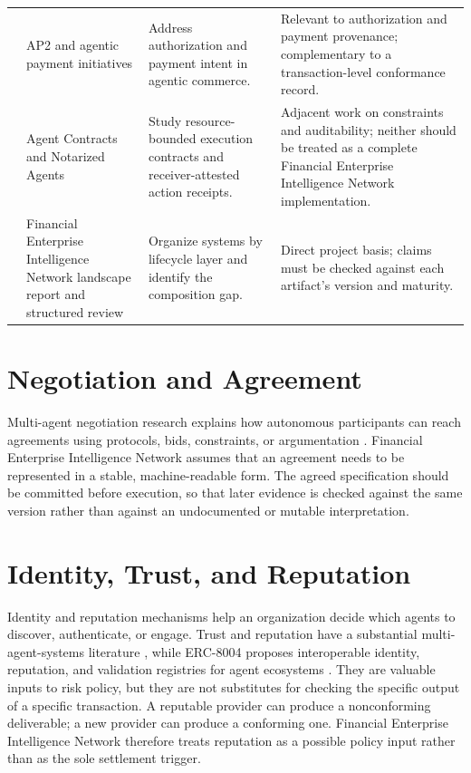 \documentclass[12pt,a4paper,oneside]{report}
\begin{document}
\begin{longtable}{>{\raggedright\arraybackslash}p{}>{\raggedright\arraybackslash}p{}>{\raggedright\arraybackslash}p{}>{\raggedright\arraybackslash}p{}}
8 & AP2 and agentic payment initiatives & Address authorization and payment intent in agentic commerce. & Relevant to authorization and payment provenance; complementary to a transaction-level conformance record.\\
9 & Agent Contracts and Notarized Agents \cite{ye2026,figuera2026} & Study resource-bounded execution contracts and receiver-attested action receipts. & Adjacent work on constraints and auditability; neither should be treated as a complete Financial Enterprise Intelligence Network implementation.\\
10 & Financial Enterprise Intelligence Network landscape report and structured review & Organize systems by lifecycle layer and identify the composition gap. & Direct project basis; claims must be checked against each artifact's version and maturity.\\
\bottomrule
\end{longtable}

\section{Negotiation and Agreement}
Multi-agent negotiation research explains how autonomous participants can reach agreements using protocols, bids, constraints, or argumentation \cite{beer1999}. Financial Enterprise Intelligence Network assumes that an agreement needs to be represented in a stable, machine-readable form. The agreed specification should be committed before execution, so that later evidence is checked against the same version rather than against an undocumented or mutable interpretation.

\section{Identity, Trust, and Reputation}
Identity and reputation mechanisms help an organization decide which agents to discover, authenticate, or engage. Trust and reputation have a substantial multi-agent-systems literature \cite{ramchurn,huynhfire}, while ERC-8004 proposes interoperable identity, reputation, and validation registries for agent ecosystems \cite{erc8004}. They are valuable inputs to risk policy, but they are not substitutes for checking the specific output of a specific transaction. A reputable provider can produce a nonconforming deliverable; a new provider can produce a conforming one. Financial Enterprise Intelligence Network therefore treats reputation as a possible policy input rather than as the sole settlement trigger.
\end{document}
